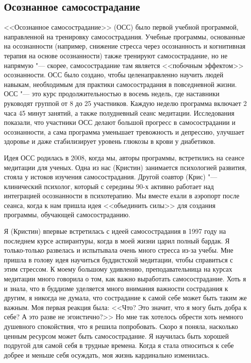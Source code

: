 	
	\subsection{Осознанное самосострадание}
	
	<<Осознанное самосострадание>> (ОСС) было первой учебной программой, направленной на тренировку самосострадания. Учебные программы, основанные на осознанности (например, снижение стресса через осознанность и когнитивная терапия на основе осознанности) также тренируют самосострадание, но не напрямую "--- скорее, самосострадание там является <<побочным эффектом>> осознанности. ОСС было создано, чтобы целенаправленно научить людей навыкам, необходимым для практики самосострадания в повседневной жизни. ОСС "--- это курс продолжительностью в восемь недель, где наставники руководят группой от 8 до 25 участников. Каждую неделю программа включает 2 часа 45 минут занятий, а также полудневный сеанс медитации. Исследования показали, что участники ОСС делают большой прогресс в самосострадании и осознанности, а сама программа уменьшает тревожность и депрессию, улучшает здоровье и даже стабилизирует уровень глюкозы в крови у диабетиков.
	
	Идея ОСС родилась в 2008, когда мы, авторы программы, встретились на сеансе  медитации для ученых. Одна из нас (Кристин) занимается психологией развития, стояла у истоков изучения самосострадания. Другой соавтор (Крис) "--- клинический психолог, который с середины 90-х активно работает над интеграцией осознанности в психотерапию. Мы вместе ехали в аэропорт после сеанса, когда к нам пришла идея <<объединить силы>> для создания программы, обучающей самосостраданию.
	
	Я (Кристин) впервые встретилась с идеей самосострадания в 1997 году на последнем курсе аспирантуры, когда в моей жизни царил полный бардак. Я только-только развелась и испытывала очень много стресса из-за учебы. Мне пришла в голову идея научиться буддистской медитации, чтобы справиться с этим стрессом. К моему большому удивлению, преподавательница на курсах медитации много говорила о том, как важно выработать самосострадание. Хоть я и знала, что в буддизме уделяется много внимания важности сострадания к другим, я никогда не думала, что сострадание к самой себе может быть таким же важным. Моя первая реакция была: <<Что? Это значит, что я могу быть добра к себе? А это разве не эгоистично?>> Но мне так хотелось обрести хоть немного душевного спокойствия, что я решила попробовать. Скоро я поняла, насколько ценным ресурсом может быть самосострадание. Я научилась быть хорошей подругой для самой себя в трудные времена. Когда я стала относиться к себе добрее и меньше себя осуждать, моя жизнь кардинально изменилась. 
	
